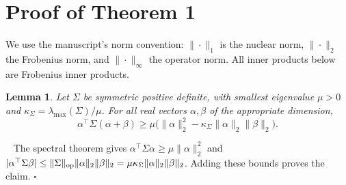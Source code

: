 \documentclass[12pt]{article}
\newtheorem{lemma}{Lemma}
\newenvironment{pf}{{\noindent\it Proof}\ }{\hfill $\square$\par}
\begin{document}
\setcounter{thm}{4}
\setcounter{cor}{4}
\setcounter{prop}{0}
\setcounter{lemma}{0}
\setcounter{assump}{6}
\setcounter{remark}{0}
\setcounter{emp}{2}
\section{Proof of Theorem 1}\label{pf:thm_error_bound}

We use the manuscript's norm convention: $\|\cdot\|_1$ is the nuclear
norm, $\|\cdot\|_2$ the Frobenius norm, and $\|\cdot\|_\infty$ the
operator norm. All inner products below are Frobenius inner products.

\begin{lemma}\label{lem1}\label{lemm_convex}
Let $\Sigma$ be symmetric positive definite, with smallest eigenvalue
$\mu>0$ and $\kappa_\Sigma=\lambda_{\max}(\Sigma)/\mu$.
For all real vectors $\alpha,\beta$ of the appropriate dimension,
\begin{equation}\label{eq_lemm_convex}
 \alpha^\top\Sigma(\alpha+\beta)
 \ge \mu\bigl(\|\alpha\|_2^2-
       \kappa_\Sigma\|\alpha\|_2\|\beta\|_2\bigr).
\end{equation}
\end{lemma}
\begin{pf}
The spectral theorem gives
$\alpha^\top\Sigma\alpha\ge\mu\|\alpha\|_2^2$ and
$|\alpha^\top\Sigma\beta|\le\|\Sigma\|_{\rm op}
\|\alpha\|_2\|\beta\|_2=\mu\kappa_\Sigma
\|\alpha\|_2\|\beta\|_2$. Adding these bounds proves the claim.
\end{pf}
\end{document}

